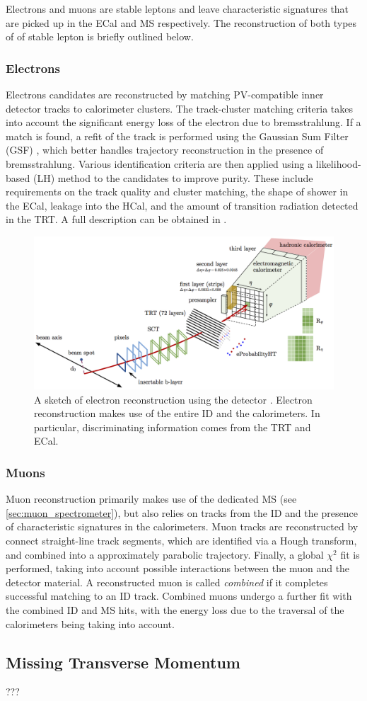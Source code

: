 Electrons and muons are stable leptons and leave characteristic signatures that are picked up in the ECal and MS respectively.
The reconstruction of both types of of stable lepton is briefly outlined below.

\subsubsection{Electrons}
Electrons candidates are reconstructed by matching PV-compatible inner detector tracks to calorimeter clusters.
The track-cluster matching criteria takes into account the significant energy loss of the electron due to bremsstrahlung.
If a match is found, a refit of the track is performed using the Gaussian Sum Filter (GSF) \cite{ATLAS-CONF-2012-047}, which better handles trajectory reconstruction in the presence of bremsstrahlung.
Various identification criteria are then applied using a  likelihood-based (LH) method to the candidates to improve purity.
These include requirements on the track quality and cluster matching, the shape of shower in the ECal, leakage into the HCal, and the amount of transition radiation detected in the TRT.
A full description can be obtained in .
%
\begin{figure}[!htbp]
  \centering
  \includegraphics[width=0.8\linewidth]{chapters/2.detector/figs/electron_reco.png}
  \caption{
    A sketch of electron reconstruction using the \ATLAS detector \cite{ATLAS-CONF-2016-024}.
    Electron reconstruction makes use of the entire ID and the calorimeters.
    In particular, discriminating information comes from the TRT and ECal.
  }
  \label{fig:electron_Reco}
\end{figure}
%


\subsubsection{Muons}
Muon reconstruction primarily makes use of the dedicated MS (see \cref{sec:muon_spectrometer}), but also relies on tracks from the ID and the presence of characteristic signatures in the calorimeters.
Muon tracks are reconstructed by connect straight-line track segments, which are identified via a Hough transform, and combined into a approximately parabolic trajectory.
Finally, a global $\chi^2$ fit is performed, taking into account possible interactions between the muon and the detector material.
A reconstructed muon is called \textit{combined} if it completes successful matching to an ID track.
Combined muons undergo a further fit with the combined ID and MS hits, with the energy loss due to the traversal of the calorimeters being taking into account.


\subsection{Missing Transverse Momentum}\label{sec:missing_Et}

???
